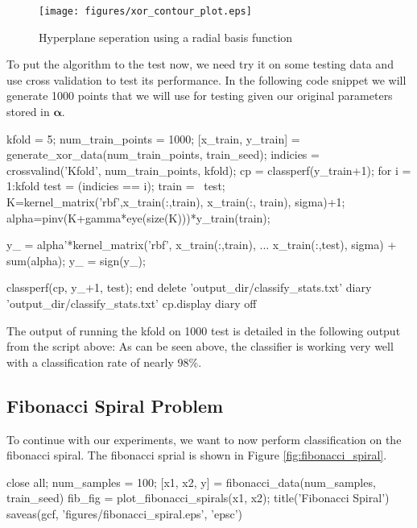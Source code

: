 \documentclass[11pt, twoside]{article}   	%
\newenvironment{matlab}{\comment}{\endcomment}
\begin{document}
\begin{figure}[h]
\centering
\texttt{[image: figures/xor\_contour\_plot.eps]}
\caption{Hyperplane seperation using a radial basis function}
\label{fig:xor_contour_plot} 
\end{figure}

To put the algorithm to the test now, we need try it on some testing data
and use cross validation to test its performance. In the following code
snippet we will generate 1000 points that we will use for testing given our
original parameters stored in $\bm{\alpha}$.

\begin{matlab}
kfold = 5; 
num_train_points = 1000; 
[x_train, y_train] = generate_xor_data(num_train_points, train_seed);
indicies = crossvalind('Kfold', num_train_points, kfold); 
cp = classperf(y_train+1);
for i = 1:kfold
   test = (indicies == i); train = ~test;
   K=kernel_matrix('rbf',x_train(:,train), x_train(:, train), sigma)+1; 
   alpha=pinv(K+gamma*eye(size(K)))*y_train(train);
   
   y_ = alpha'*kernel_matrix('rbf', x_train(:,train), ...
      x_train(:,test), sigma) + sum(alpha); 
   y_ = sign(y_);
   
   classperf(cp, y_+1, test);
end
delete 'output_dir/classify_stats.txt'
diary 'output_dir/classify_stats.txt'
cp.display
diary off
\end{matlab}

The output of running the kfold on 1000 test is detailed in the following
output from the script above: 
\color{lightgray}
\color{black}
As can be seen above, the classifier is working very well with a classification rate of nearly 98\%. 

\subsection{Fibonacci Spiral Problem}
To continue with our experiments, we want to now perform classification on
the fibonacci spiral. The fibonacci sprial is shown in Figure \ref{fig:fibonacci_spiral}. 

\begin{matlab}
close all;
num_samples = 100; 
[x1, x2, y] = fibonacci_data(num_samples, train_seed)
fib_fig = plot_fibonacci_spirals(x1, x2); 
title('Fibonacci Spiral')
saveas(gcf, 'figures/fibonacci_spiral.eps', 'epsc')
\end{matlab}
\end{document}
